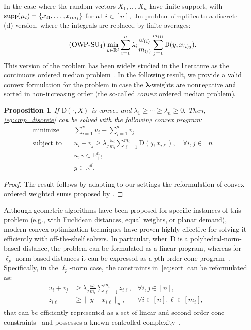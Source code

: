 \documentclass[letter,11pt, reqno]{amsart}
\newcommand{\R}{\mathbb{R}}
\newcommand{\D}{\mathrm{D}}
\renewcommand{\;}{\quad}
\theoremstyle{thmstyleone}%
\newtheorem{proposition}[theorem]{Proposition}%
\theoremstyle{thmstyletwo}%
\theoremstyle{thmstylethree}%
\begin{document}
In the case where the random vectors $X_1, \ldots, X_n$ have finite support, with ${\rm supp}(\mu_i) = \{x_{i1}, \ldots, x_{im_i}\}$ for all $i \in [n]$, the problem simplifies to a discrete ({\rm d}) version, where the integrals are replaced by finite averages:
\begin{equation}\label{eq:omp_discrete}\tag{\rm OWP-SU$_{\rm d}$}
\min_{y \in \R^d} \sum_{i=1}^n \lambda_i \frac{\omega_{(i)}}{m_{(i)}} \sum_{j=1}^{m_{(i)}} \D(y, x_{(i)j}).
\end{equation}
This version of the problem has been widely studied in the literature as the continuous ordered median problem~\citep[see, e.g.,][]{blanco2014revisiting}. In the following result, we provide a valid convex formulation for the problem in case the $\bm{\lambda}$-weights are nonnegative and sorted in non-increasing order (the so-called \emph{convex} ordered median problem).
\begin{proposition}
    If $\D(\cdot,X)$ is convex and $\lambda_1 \geq \cdots \geq \lambda_n \geq 0$. Then, \ref{eq:omp_discrete} can be solved with the following convex program:
    \begin{align}
        \text{minimize} & \; \sum_{i=1}^n u_i + \sum_{j=1}^n v_j\nonumber\\
        \text{subject to} & \;  u_i + v_j \geq \lambda_j \frac{\omega_{i}}{m_{i}} \sum_{\ell=1}^{m_{i}} \D(y,x_{i\ell}), \; \forall i, j \in [n];\label{eq:sort}\\
        & \; u, v \in \R^n_+;\nonumber\\
        & \; y \in \R^d.\nonumber
    \end{align}
\end{proposition}
\begin{proof}
    The result follows by adapting to our settings the reformulation of convex ordered weighted sums proposed by \cite{blanco2014revisiting}.
\end{proof}
Although geometric algorithms have been proposed for specific instances of this problem (e.g., with Euclidean distances, equal weights, or planar demand), modern convex optimization techniques have proven highly effective for solving it efficiently with off-the-shelf solvers. In particular, when $\D$ is a polyhedral-norm-based distance, the problem can be formulated as a linear program, whereas for $\ell_p$-norm-based distances it can be expressed as a $p$th-order cone program~\citep{blanco2014revisiting,blanco2024minimal}. Specifically, in the $\ell_p$-norm case, the constraints in~\eqref{eq:sort} can be reformulated as:
\begin{align*}
u_i + v_j &\geq \lambda_j \frac{\omega_{i}}{m_{i}} \sum_{\ell=1}^{m_{i}} z_{i\ell}, & \forall i, j \in [n],\\
z_{i\ell} &\geq \|y - x_{i\ell}\|_p, &\forall i \in [n], \ell \in [m_i],
\end{align*}
that can be efficiently represented as a set of linear and second-order cone constraints~\citep{blanco2024minimal} and possesses a known controlled complexity~\citep{blanco2025complexity}.
\end{document}
